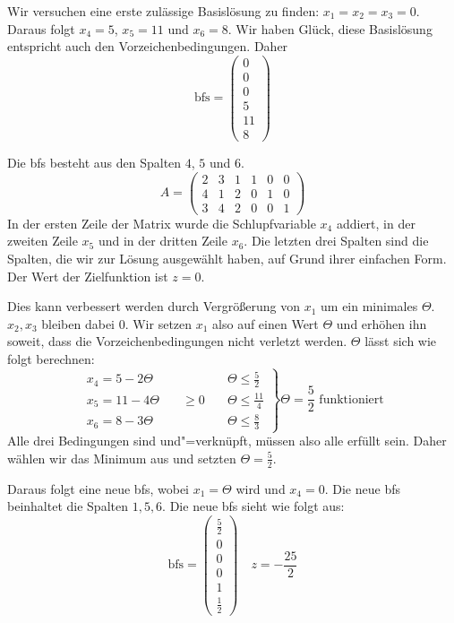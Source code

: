 \begin{Bsp}
  Wir versuchen eine erste zulässige Basislösung zu finden: $x_1 = x_2 = x_3 = 0$. Daraus folgt $x_4 =5$, $x_5 = 11$ und $x_6 = 8$. Wir haben Glück, diese Basislösung entspricht auch den Vorzeichenbedingungen. Daher
  \[ \text{bfs} = \begin{pmatrix} 0 \\ 0 \\ 0 \\ 5 \\ 11 \\ 8 \end{pmatrix} \]
  
  Die bfs besteht aus den Spalten $4$, $5$ und $6$.
  \[ A= \begin{pmatrix} 2 & 3 & 1 & 1 & 0 &0 \\ 4 & 1 & 2 & 0 & 1 & 0 \\ 3 & 4 & 2 & 0 & 0 & 1\end{pmatrix} \]
  In der ersten Zeile der Matrix wurde die Schlupfvariable $x_4$ addiert, in der zweiten Zeile $x_5$ und in der dritten Zeile $x_6$. Die letzten drei Spalten sind die Spalten, die wir zur Lösung ausgewählt haben, auf Grund ihrer einfachen Form. Der Wert der Zielfunktion ist $z=0$.
  
  Dies kann verbessert werden durch Vergrößerung von $x_1$ um ein minimales $\Theta$. $x_2, x_3$ bleiben dabei $0$. Wir setzen $x_1$ also auf einen Wert $\Theta$ und erhöhen ihn soweit, dass die Vorzeichenbedingungen nicht verletzt werden. $\Theta$ lässt sich wie folgt berechnen:
\[
  \left.
    \begin{matrix}
        x_4 = 5 - 2\Theta &&\Theta \le \frac{5}{2}\\
        x_5 = 11 - 4 \Theta &\quad \ge 0 \quad& \Theta \le \frac{11}{4}\\
        x_6 = 8-3 \Theta && \Theta \le \frac{8}{3}
      \end{matrix}
    \right\}
    \Theta = \frac{5}{2} \text{ funktioniert}
  \]
  Alle drei Bedingungen sind und"=verknüpft, müssen also alle erfüllt sein. Daher wählen wir das Minimum aus und setzten $\Theta = \frac{5}{2}$.

  Daraus folgt eine neue bfs, wobei $x_1 = \Theta$ wird und $x_4 = 0$. Die neue bfs beinhaltet die Spalten $1, 5, 6$. Die neue bfs sieht wie folgt aus:
  \[ \text{bfs} = \begin{pmatrix} \frac{5}{2} \\ 0 \\ 0 \\ 0 \\ 1 \\ \frac{1}{2} \end{pmatrix} \quad z = - \frac{25}{2}\]
  

\end{Bsp}
